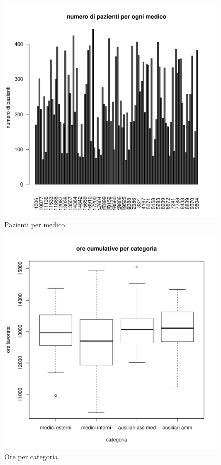 \documentclass[11pt]{article}
\begin{document}
\begin{figure}[H]
    \includegraphics[width=\linewidth]{pazienti_per_medico.pdf}
    \caption{Pazienti per medico}
    \label{fig:pazienti_per_medico}
\end{figure}

\begin{figure}[H]
    \includegraphics[width=\linewidth]{ore_per_categoria.pdf}
    \caption{Ore per categoria}
    \label{fig:ore_per_categoria}
\end{figure}
\end{document}
